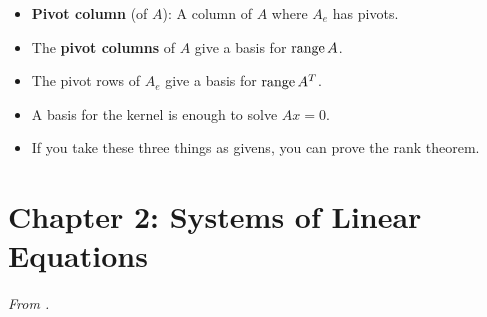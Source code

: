 \documentclass[../../notes.tex]{subfiles}
\begin{document}
\begin{itemize}
\begin{itemize}
    \end{itemize}
    \item \textbf{Pivot column} (of $A$): A column of $A$ where $A_e$ has pivots.
    \item The \textbf{pivot columns} of $A$ give a basis for $\operatorname{range} A$.
    \item The pivot rows of $A_e$ give a basis for $\operatorname{range} A^T$.
    \item A basis for the kernel is enough to solve $Ax=0$.
    \item If you take these three things as givens, you can prove the rank theorem.
\end{itemize}



\section{Chapter 2: Systems of Linear Equations}
\emph{From \textcite{bib:Treil}.}
\end{document}
